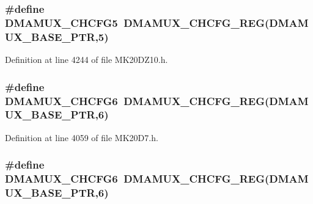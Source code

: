 \subsubsection[{\texorpdfstring{D\+M\+A\+M\+U\+X\+\_\+\+C\+H\+C\+F\+G5}{DMAMUX_CHCFG5}}]{\setlength{\rightskip}{0pt plus 5cm}\#define D\+M\+A\+M\+U\+X\+\_\+\+C\+H\+C\+F\+G5~{\bf D\+M\+A\+M\+U\+X\+\_\+\+C\+H\+C\+F\+G\+\_\+\+R\+EG}({\bf D\+M\+A\+M\+U\+X\+\_\+\+B\+A\+S\+E\+\_\+\+P\+TR},5)}\hypertarget{group___d_m_a_m_u_x___register___accessor___macros_ga22d9e009fc1f5358e9c705e3a645c5fb}{}\label{group___d_m_a_m_u_x___register___accessor___macros_ga22d9e009fc1f5358e9c705e3a645c5fb}


Definition at line 4244 of file M\+K20\+D\+Z10.\+h.

\subsubsection[{\texorpdfstring{D\+M\+A\+M\+U\+X\+\_\+\+C\+H\+C\+F\+G6}{DMAMUX_CHCFG6}}]{\setlength{\rightskip}{0pt plus 5cm}\#define D\+M\+A\+M\+U\+X\+\_\+\+C\+H\+C\+F\+G6~{\bf D\+M\+A\+M\+U\+X\+\_\+\+C\+H\+C\+F\+G\+\_\+\+R\+EG}({\bf D\+M\+A\+M\+U\+X\+\_\+\+B\+A\+S\+E\+\_\+\+P\+TR},6)}\hypertarget{group___d_m_a_m_u_x___register___accessor___macros_gad0e1b84f409957938aa005484ec9f454}{}\label{group___d_m_a_m_u_x___register___accessor___macros_gad0e1b84f409957938aa005484ec9f454}


Definition at line 4059 of file M\+K20\+D7.\+h.

\subsubsection[{\texorpdfstring{D\+M\+A\+M\+U\+X\+\_\+\+C\+H\+C\+F\+G6}{DMAMUX_CHCFG6}}]{\setlength{\rightskip}{0pt plus 5cm}\#define D\+M\+A\+M\+U\+X\+\_\+\+C\+H\+C\+F\+G6~{\bf D\+M\+A\+M\+U\+X\+\_\+\+C\+H\+C\+F\+G\+\_\+\+R\+EG}({\bf D\+M\+A\+M\+U\+X\+\_\+\+B\+A\+S\+E\+\_\+\+P\+TR},6)}\hypertarget{group___d_m_a_m_u_x___register___accessor___macros_gad0e1b84f409957938aa005484ec9f454}{}\label{group___d_m_a_m_u_x___register___accessor___macros_gad0e1b84f409957938aa005484ec9f454}


